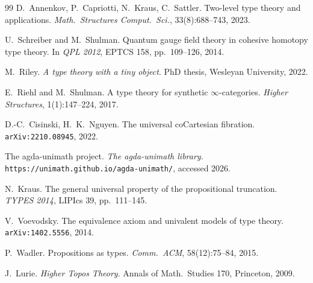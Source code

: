 \documentclass[12pt]{article}
\theoremstyle{definition}
\theoremstyle{remark}
\begin{document}
\begin{thebibliography}{99}
D.\ Annenkov, P.\ Capriotti, N.\ Kraus, C.\ Sattler.
Two-level type theory and applications.
\emph{Math.\ Structures Comput.\ Sci.}, 33(8):688--743, 2023.

U.\ Schreiber and M.\ Shulman. Quantum gauge field theory in cohesive
homotopy type theory. In \emph{QPL 2012}, EPTCS 158, pp.\ 109--126, 2014.

M.\ Riley. \emph{A type theory with a tiny object}.
PhD thesis, Wesleyan University, 2022.

E.\ Riehl and M.\ Shulman. A type theory for synthetic
$\infty$-categories. \emph{Higher Structures}, 1(1):147--224, 2017.

D.-C.\ Cisinski, H.\ K.\ Nguyen.
The universal coCartesian fibration. \texttt{arXiv:2210.08945}, 2022.

The agda-unimath project. \emph{The agda-unimath library}.
\texttt{https://unimath.github.io/agda-unimath/}, accessed 2026.

N.\ Kraus. The general universal property of the propositional truncation.
\emph{TYPES 2014}, LIPIcs 39, pp.\ 111--145.

V.\ Voevodsky. The equivalence axiom and univalent models of type theory.
\texttt{arXiv:1402.5556}, 2014.

P.\ Wadler. Propositions as types.
\emph{Comm.\ ACM}, 58(12):75--84, 2015.

J.\ Lurie. \emph{Higher Topos Theory}.
Annals of Math.\ Studies 170, Princeton, 2009.

\end{thebibliography}
\end{document}
